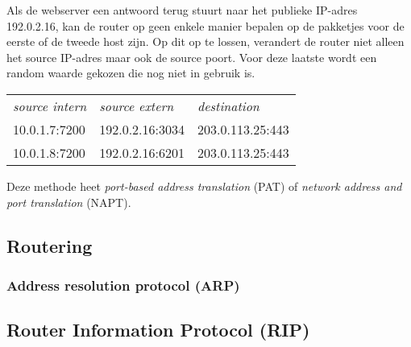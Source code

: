 \begin{enumerate}
\begin{center}
\begin{tabular}{lll}
   \end{tabular}
   \end{center}
   Als de webserver een antwoord terug stuurt naar het publieke IP-adres 192.0.2.16, kan de router op geen enkele manier bepalen op de pakketjes voor de eerste of de tweede host zijn.
   Op dit op te lossen, verandert de router niet alleen het source IP-adres maar ook de source poort.
   Voor deze laatste wordt een random waarde gekozen die nog niet in gebruik is.
   \begin{center}
   \begin{tabular}{lll}
   \textit{source intern} & \textit{source extern} & \textit{destination} \\[1ex]
   10.0.1.7:7200          & 192.0.2.16:3034        & 203.0.113.25:443 \\
   10.0.1.8:7200          & 192.0.2.16:6201        & 203.0.113.25:443 \\
   \end{tabular}
   \end{center}
   Deze methode heet \emph{port-based address translation} (PAT) of \emph{network address and port translation} (NAPT).
\end{enumerate}




\subsection{Routering}
\label{sec:routering}


\subsubsection{Address resolution protocol (ARP)}
\label{sec:arp}



\subsection{Router Information Protocol (RIP)}



